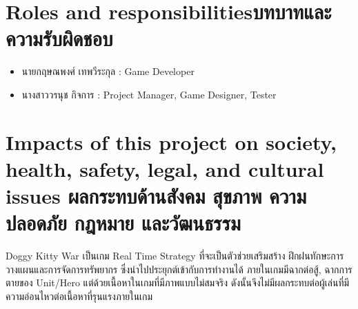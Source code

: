 \section{\ifenglish Roles and responsibilities\else บทบาทและความรับผิดชอบ\fi}
\begin{itemize}
    \item นายกฤษณพงศ์ เทพวีระกุล : Game Developer 
    \item นางสาววรนุช กิจการ : Project Manager, Game Designer, Tester
\end{itemize}
\section{\ifenglish%
Impacts of this project on society, health, safety, legal, and cultural issues
\else%
ผลกระทบด้านสังคม สุขภาพ ความปลอดภัย กฎหมาย และวัฒนธรรม\fi}

\qquad Doggy Kitty War เป็นเกม Real Time Strategy ที่จะเป็นตัวช่วยเสริมสร้าง ฝึกฝนทักษะการวางแผนและการจัดการทรัพยากร
 ซึ่งนําไปประยุกต์เข้ากับการทํางานได้ ภายในเกมมีฉากต่อสู้, ฉากการตายของ Unit/Hero แต่ด้วยเนื้อหาในเกมที่มีภาพแบบไม่สมจริง 
 ดังนั้นจึงไม่มีผลกระทบต่อผู้เล่นที่มีความอ่อนไหวต่อเนื้อหาที่รุนแรงภายในเกม